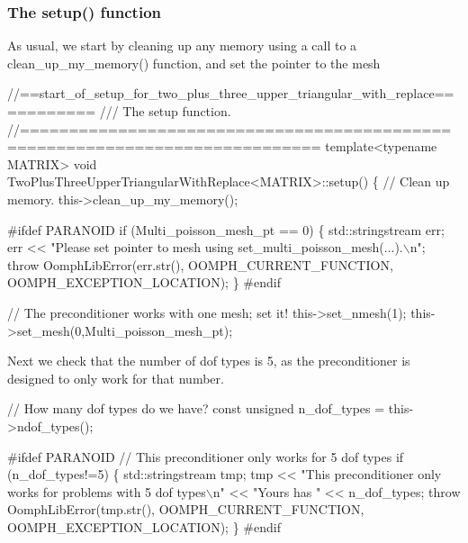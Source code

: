 \hypertarget{index_two_plus_three_upper_triangular_with_replace_setup}{}\subsubsection{The setup() function}\label{index_two_plus_three_upper_triangular_with_replace_setup}
As usual, we start by cleaning up any memory using a call to a {\ttfamily clean\+\_\+up\+\_\+my\+\_\+memory()} function, and set the pointer to the mesh


\begin{DoxyCodeInclude}
 \textcolor{comment}{//==start\_of\_setup\_for\_two\_plus\_three\_upper\_triangular\_with\_replace===========}\textcolor{comment}{}
\textcolor{comment}{ /// The setup function.}
\textcolor{comment}{} \textcolor{comment}{//============================================================================}
 \textcolor{keyword}{template}<\textcolor{keyword}{typename} MATRIX> 
 \textcolor{keywordtype}{void} TwoPlusThreeUpperTriangularWithReplace<MATRIX>::setup()
 \{
  \textcolor{comment}{// Clean up memory.}
  this->clean\_up\_my\_memory();

\textcolor{preprocessor}{#ifdef PARANOID}
  \textcolor{keywordflow}{if} (Multi\_poisson\_mesh\_pt == 0)
   \{
    std::stringstream err;
    err << \textcolor{stringliteral}{"Please set pointer to mesh using set\_multi\_poisson\_mesh(...).\(\backslash\)n"};
    \textcolor{keywordflow}{throw} OomphLibError(err.str(),
                        OOMPH\_CURRENT\_FUNCTION,
                        OOMPH\_EXCEPTION\_LOCATION);
   \}
\textcolor{preprocessor}{#endif }
  
  \textcolor{comment}{// The preconditioner works with one mesh; set it!}
  this->set\_nmesh(1);
  this->set\_mesh(0,Multi\_poisson\_mesh\_pt);

\end{DoxyCodeInclude}


Next we check that the number of dof types is 5, as the preconditioner is designed to only work for that number.


\begin{DoxyCodeInclude}
  \textcolor{comment}{// How many dof types do we have?}
  \textcolor{keyword}{const} \textcolor{keywordtype}{unsigned} n\_dof\_types = this->ndof\_types();

\textcolor{preprocessor}{#ifdef PARANOID}
  \textcolor{comment}{// This preconditioner only works for 5 dof types}
  \textcolor{keywordflow}{if} (n\_dof\_types!=5)
   \{
    std::stringstream tmp;
    tmp << \textcolor{stringliteral}{"This preconditioner only works for problems with 5 dof types\(\backslash\)n"}
        << \textcolor{stringliteral}{"Yours has "} << n\_dof\_types;
    \textcolor{keywordflow}{throw} OomphLibError(tmp.str(),
                        OOMPH\_CURRENT\_FUNCTION,
                        OOMPH\_EXCEPTION\_LOCATION);
   \}
\textcolor{preprocessor}{#endif}

\end{DoxyCodeInclude}


